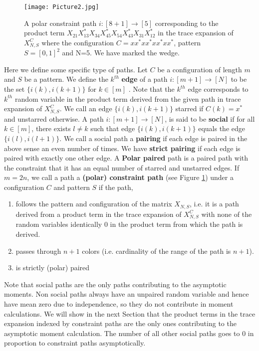 \documentclass[12pt]{amsart}
\theoremstyle{definition}
\theoremstyle{remark}
\begin{document}
\begin{figure}[!] 
    \centering
\texttt{[image: Picture2.jpg]}
    \caption{A polar constraint path $i:[8+1] \to [5]$ corresponding to the product term $X_{21}X^*_{13}X_{34}X^*_{45}X_{54}X^*_{43}X_{31}X^*_{12}$ in the trace expansion of $X_{N,S}^C$ where the configuration $C=xx^*xx^* xx^*xx^*$, pattern $S=[0,1]^2$ and N=5. We have marked the wedge.}
    \label{fig3}
\end{figure}


Here we define some specific type of paths. Let $C$ be a configuration of length $m$ and $S$ be a pattern. We define the $k^{th}$ \textbf{edge} of a path $i:[m+1] \to [N]$ to be the set $\{i(k),i(k+1)\}$ for $k\in [m]$ . Note that the $k^{th}$ edge corresponds to $k^{th}$ random variable in the product term derived from the given path in trace expansion of $X_{N,S}^C$. We call an edge $\{i(k),i(k+1)\}$ starred if $C(k)=x^*$ and unstarred otherwise. A path $i:[m+1] \to [N]$, is said to be \textbf{social} if for all $k \in [m]$, there exists $l \neq k$ such that edge $\{i(k),i(k+1) \}$ equals the edge $\{i(l),i(l+1) \}$. We call a social path a \textbf{pairing} if each edge is paired in the above sense an even number of times. We have \textbf{strict pairing} if each edge is paired with exactly one other edge. A \textbf{Polar paired} path is a paired path with the constraint that it has an equal number of starred and unstarred edges. If $m=2n$, we call a path a \textbf{(polar) constraint path} (see Figure \ref{fig3}) under a configuration $C$ and pattern $S$ if the path,
\begin{enumerate}
    \item follows the pattern and configuration of the matrix $X_{N,S}$, i.e. it is a path derived from a product term in the trace expansion of $X_{N,S}^C$ with none of the random variables identically 0 in the product term from which the path is derived.
    \item passes through $n+1$ colors (i.e. cardinality of the range of the path is $n+1$).
    \item is strictly (polar) paired
\end{enumerate}
 Note that social paths are the only paths contributing to the asymptotic moments. Non social paths always have an unpaired random variable and hence have mean zero due to independence, so they do not contribute in moment calculations. We will show in the next Section that the product terms in the trace expansion indexed by constraint paths are the only ones contributing to the asymptotic moment calculation. The number of all other social paths goes to 0 in proportion to constraint paths asymptotically.\\
\end{document}
